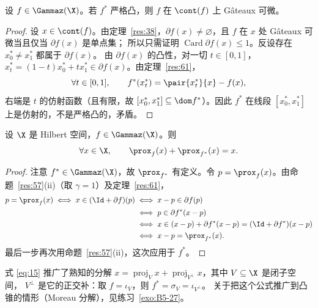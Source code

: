 \begin{example}
\label{exa:20}
设 $f\in\Gammaz(\X)$。若 $f^*$ 严格凸，则 $f$ 在 $\cont(f)$ 上 Gâteaux 可微。
\end{example}

\begin{proof}
设 $x\in\cont(f)$。由定理~\ref{res:38}，$\partial f(x)\neq\varnothing$，且 $f$ 在 $x$ 处 Gâteaux 可微当且仅当 $\partial f(x)$ 是单点集；
所以只需证明 $\operatorname{Card}\partial f(x)\leqslant1$。反设存在 $x_0^*\neq x_1^*$ 都属于 $\partial f(x)$。
由 $\partial f(x)$ 的凸性，对一切 $t\in[0,1]$，$x_t^*=(1-t)x_0^*+tx_1^*\in\partial f(x)$。由定理~\ref{res:61}，
\[
  \forall t\in[0,1],\qquad f^*(x_t^*)=\pair{x_t^*}{x}-f(x),
\]
右端是 $t$ 的仿射函数（且有限，故 $[x_0^*,x_1^*]\subseteq\dom f^*$）。因此 $f^*$ 在线段 $[x_0^*,x_1^*]$ 上是仿射的，不是严格凸的，矛盾。
\end{proof}

\begin{corollary}[共轭函数的邻近算子]
\label{res:62}
设 $\X$ 是 Hilbert 空间，$f\in\Gammaz(\X)$。则
\begin{equation}
  \label{eq:15}
  \forall x\in\X,\qquad \prox_f(x)+\prox_{f^*}(x)=x .
\end{equation}
\end{corollary}

\begin{proof}
注意 $f^*\in\Gammaz(\X)$，故 $\prox_{f^*}$ 有定义。令 $p=\prox_f(x)$。由命题~\ref{res:57}(ii)（取 $\gamma=1$）及定理~\ref{res:61}，
\[
  \begin{aligned}
  p=\prox_f(x)\iff x\in(\Id+\partial f)(p)
  &\iff x-p\in\partial f(p)\\
  &\iff p\in\partial f^*(x-p)\\
  &\iff x\in(x-p)+\partial f^*(x-p)=(\Id+\partial f^*)(x-p)\\
  &\iff x-p=\prox_{f^*}(x).
  \end{aligned}
\]
最后一步再次用命题~\ref{res:57}(ii)，这次应用于 $f^*$。
\end{proof}

\begin{remark}
\label{rem:22}
式 \eqref{eq:15} 推广了熟知的分解 $x=\operatorname{proj}_Vx+\operatorname{proj}_{V^\perp}x$，其中 $V\subseteq\X$ 是闭子空间，
$V^\perp$ 是它的正交补：取 $f=\iota_V$，则 $f^*=\sigma_V=\iota_{V^\perp}$。
关于把这个公式推广到凸锥的情形（Moreau 分解），见练习~\ref{exo:B5-27}。
\end{remark}

